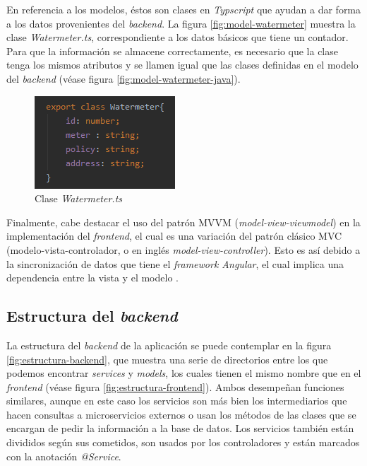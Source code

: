 \documentclass[pdftex,11pt,a4paper]{book}
\begin{document}
En referencia a los modelos, éstos son clases en \textit{Typscript} que ayudan a dar forma a los datos provenientes del \textit{backend}. La figura \ref{fig:model-watermeter} muestra la clase \textit{Watermeter.ts}, correspondiente a los datos básicos que tiene un contador. Para que la información se almacene correctamente, es necesario que la clase tenga los mismos atributos y se llamen igual que las clases definidas en el modelo del \textit{backend} (véase figura \ref{fig:model-watermeter-java}).


 \begin{figure}[h]
 \centering
 \includegraphics [scale=0.72] {images/implementacion/watermeter-model.png}
 \caption{Clase \textit{Watermeter.ts}} \label{fig:service-watermeter}
 \end{figure}
 

Finalmente, cabe destacar el uso del patrón MVVM (\textit{model-view-viewmodel}) en la implementación del \textit{frontend}, el cual es una variación del patrón clásico MVC (modelo-vista-controlador, o en inglés \textit{model-view-controller}). Esto es así debido a la sincronización de datos que tiene el \textit{framework Angular}, el cual implica una dependencia entre la vista y el modelo \cite{bib:angular-MVC}.



\subsection{Estructura del \textit{backend}}

La estructura del \textit{backend} de la aplicación se puede contemplar en la figura \ref{fig:estructura-backend}, que muestra una serie de directorios entre los que podemos encontrar \textit{services} y \textit{models}, los cuales tienen el mismo nombre que en el \textit{frontend} (véase figura \ref{fig:estructura-frontend}). Ambos desempeñan funciones similares, aunque en este caso los servicios son más bien los intermediarios que hacen consultas a microservicios externos o usan los métodos de las clases que se encargan de pedir la información a la base de datos. Los servicios también están divididos según sus cometidos, son usados por los controladores y están marcados con la anotación \textit{@Service}.
\end{document}
